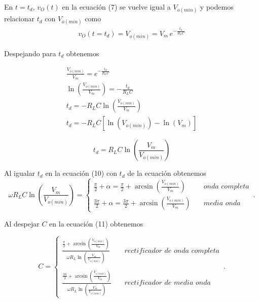 \documentclass{article}
\begin{document}
\noindent En $t = t_d$, $v_O(t)$ en la ecuación (7) se vuelve igual a $V_{o(min)}$ y podemos relacionar $t_d$ con $V_{o(min)}$ como
\begin{align}
	v_O (t = t_d) = V_{o(min)} = V_m \, e^{ -\frac{t_d}{R_L C} }
\end{align}

\noindent Despejando para $t_d$ obtenemos

\begin{align*}
	\frac{V_{o(min)}}{V_m} = e^{ -\frac{t_d}{R_L C} }\\
	\ln{ \left( \frac{V_{o(min)}}{V_m} \right) } = - \frac{t_d}{R_L C}\\
	t_d = -R_L C \ln{ \left( \frac{V_{o(min)}}{V_m} \right) }\\
	t_d = -R_L C \left[ \ln( V_{o(min)} )- \ln (V_m) \right]
\end{align*}

\begin{tcolorbox}[colback=red!5!white,colframe=red!75!black,arc=0mm,boxrule=0mm,width=(\linewidth+0.5cm)]
	\begin{equation}
		t_d = R_L C\ln \left( \frac{V_m}{V_{o(min)}} \right)
	\end{equation}
\end{tcolorbox}

\noindent Al igualar $t_d$ en la ecuación (10) con $t_d$ de la ecuación obtenemos
\begin{equation}
	\omega R_L C\ln \left( \frac{V_m}{V_{o(min)}} \right) =  
	\begin{cases}
		\frac{\pi}{2} + \alpha = \frac{\pi}{2} + \arcsin\left(  \frac{V_{o(min)}}{V_m}\right) \quad & onda \,\, completa\\
		\frac{3\pi}{2} + \alpha = \frac{3\pi}{2} + \arcsin\left(  \frac{V_{o(min)}}{V_m}\right) \quad & media \,\, onda
	\end{cases}\,.
\end{equation}

\noindent Al despejar $C$ en la ecuación (11) obtenemos
\begin{tcolorbox}[colback=red!5!white,colframe=red!75!black,arc=0mm,boxrule=0mm,width=(\linewidth+0.5cm)]
	\begin{equation}
		C = 
		\begin{cases}
			\frac{\frac{\pi}{2} + \arcsin \left( \frac{V_{o(min)}}{V_m} \right) }{\omega R_L \ln \left( \frac{V_m}{V_{o(min)}} \right)} \quad & rectificador \,\, de \,\, onda \,\, completa\\\\
			\frac{\frac{3\pi}{2} + \arcsin \left( \frac{V_{o(min)}}{V_m} \right) }{\omega R_L \ln \left( \frac{V_m}{V_{o(min)}} \right)} \quad & rectificador \,\, de \,\, media \,\, onda
		\end{cases}\,.
	\end{equation}
\end{tcolorbox}
\end{document}
